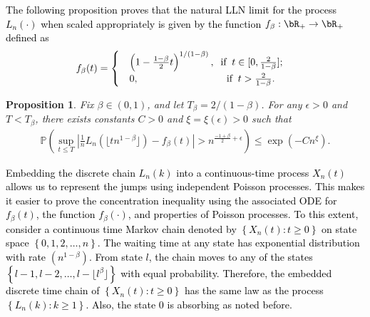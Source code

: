 \documentclass[letterpaper,11pt,reqno]{amsart}
\newtheorem{prop}[thm]{Proposition}
\theoremstyle{definition}
\renewcommand{\leq}{\leqslant}
\renewcommand{\geq}{\geqslant}
\newcommand{\set}[1]{\left\{#1\right\}}
\newcommand{\prob}{\mathbb{P}}
\begin{document}
\textcolor{black}{The following proposition proves that the natural LLN limit for the process $L_n(\cdot)$ when scaled appropriately is given by the function $f_{\beta}:\bR_+ \to\bR_+$ defined as 
\begin{align*}
&f_{\beta}(t)= \begin{cases} & \left(1-\frac{1-\beta}{2}t \right)^{1/(1-\beta)},\;\;\text{if}\;\;t\in [0,\frac{2}{1-\beta}];\\&0,\hspace{83 pt}\;\;\text{if}\;\;t>\frac{2}{1-\beta}.    
\end{cases}    
\end{align*} }

\begin{prop}\label{prop:concentration_meso_n}
    Fix $\beta \in (0,1)$, and let $T_\beta = 2/(1-\beta)$. For any $\epsilon>0$ and $T < T_\beta$, there exists constants $C>0$ and $\xi=\xi(\epsilon)>0$ such that
    \begin{align*}
        \prob\left( \sup_{t \leq T}\left|\frac{1}{n}L_n(\lfloor tn^{1-\beta} \rfloor)-f_{\beta}(t)\right|>n^{\frac{-1+\beta}{2}+\epsilon}\right)\leq \exp(-Cn^{\xi}).
    \end{align*}
\end{prop}

\textcolor{black}{Embedding the discrete chain $L_n(k)$ into a continuous-time process $X_n(t)$ allows us to represent the jumps using independent Poisson processes. This makes it easier to prove the concentration inequality using the associated ODE for $f_\beta(t)$, the function $f_\beta(\cdot)$, and properties of Poisson processes. To this extent, consider a continuous time Markov chain denoted by $\set{X_n(t):t\geq 0}$ on state space $\set{0,1,2,\dots,n}$. The waiting time at any state has exponential distribution with rate $(n^{1-\beta})$. From state $l$, the chain moves to any of the states $\set{l-1,l-2,\dots,l-\lfloor l^\beta \rfloor}$ with equal probability. Therefore, the embedded discrete time chain of $\set{X_n(t):t\geq 0}$ has the same law as the process $\set{L_n(k):k\geq 1}.$ Also, the state $0$ is absorbing as noted before.}
\end{document}
